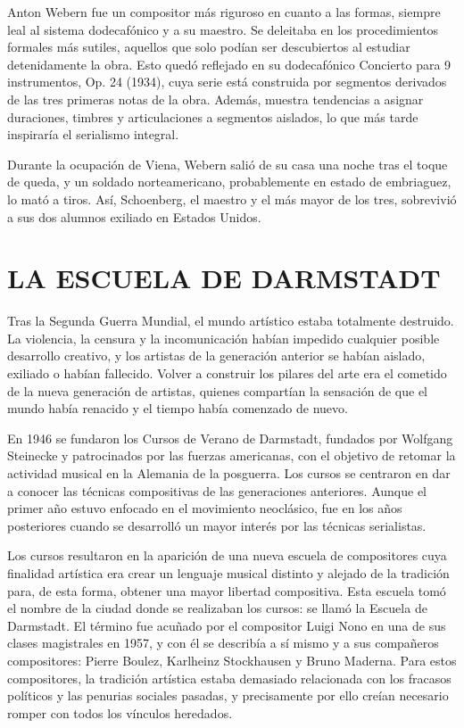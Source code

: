 	Anton Webern fue un compositor más riguroso en cuanto a las formas, siempre leal al sistema dodecafónico y a su maestro. Se deleitaba en los procedimientos formales más sutiles, aquellos que solo podían ser descubiertos al estudiar detenidamente la obra. Esto quedó reflejado en su dodecafónico Concierto para 9 instrumentos, Op. 24 (1934), cuya serie está construida por segmentos derivados de las tres primeras notas de la obra. Además, muestra tendencias a asignar duraciones, timbres y articulaciones a segmentos aislados, lo que más tarde inspiraría el serialismo integral.
        
	Durante la ocupación de Viena, Webern salió de su casa una noche tras el toque de queda, y un soldado norteamericano, probablemente en estado de embriaguez, lo mató a tiros. Así, Schoenberg, el maestro y el más mayor de los tres, sobrevivió a sus dos alumnos exiliado en Estados Unidos.
    
	\section{LA ESCUELA DE DARMSTADT}
	Tras la Segunda Guerra Mundial, el mundo artístico estaba totalmente destruido. La violencia, la censura y la incomunicación habían impedido cualquier posible desarrollo creativo, y los artistas de la generación anterior se habían aislado, exiliado o habían fallecido. Volver a construir los pilares del arte era el cometido de la nueva generación de artistas, quienes compartían la sensación de que el mundo había renacido y el tiempo había comenzado de nuevo.
	
	En 1946 se fundaron los Cursos de Verano de Darmstadt, fundados por Wolfgang Steinecke y patrocinados por las fuerzas americanas, con el objetivo de retomar la actividad musical en la Alemania de la posguerra. Los cursos se centraron en dar a conocer las técnicas compositivas de las generaciones anteriores. Aunque el primer año estuvo enfocado en el movimiento neoclásico, fue en los años posteriores cuando se desarrolló un mayor interés por las técnicas serialistas.
	
	Los cursos resultaron en la aparición de una nueva escuela de compositores cuya finalidad artística era crear un lenguaje musical distinto y alejado de la tradición para, de esta forma, obtener una mayor libertad compositiva. Esta escuela tomó el nombre de la ciudad donde se realizaban los cursos: se llamó la Escuela de Darmstadt. El término fue acuñado por el compositor Luigi Nono en una de sus clases magistrales en 1957, y con él se describía a sí mismo y a sus compañeros compositores: Pierre Boulez, Karlheinz Stockhausen y Bruno Maderna. Para estos compositores, la tradición artística estaba demasiado relacionada con los fracasos políticos y las penurias sociales pasadas, y precisamente por ello creían necesario romper con todos los vínculos heredados.
	
